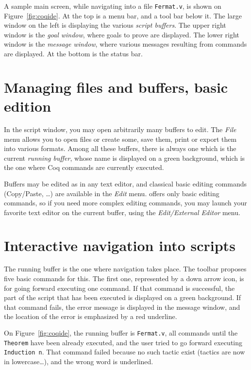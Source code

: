 A sample \CoqIDE{} main screen, while navigating into a file
\verb|Fermat.v|, is shown on Figure~\ref{fig:coqide}.  At
the top is a menu bar, and a tool bar below it. The large window on
the left is displaying the various \emph{script buffers}. The upper right
window is the \emph{goal window}, where goals to 
prove are displayed. The lower right window is the \emph{message window},
where various messages resulting from commands are displayed. At the
bottom is the status bar.

\section{Managing files and buffers, basic edition}

In the script window, you may open arbitrarily many buffers to
edit. The \emph{File} menu allows you to open files or create some,
save them, print or export them into various formats. Among all these
buffers, there is always one which is the current \emph{running
  buffer}, whose name is displayed on a green background, which is the
one where Coq commands are currently executed. 

Buffers may be edited as in any text editor, and classical basic
editing commands (Copy/Paste, \ldots) are available in the \emph{Edit}
menu. \CoqIDE{} offers only basic editing commands, so if you need
more complex editing commands, you may launch your favorite text
editor on the current buffer, using the \emph{Edit/External Editor}
menu. 

\section{Interactive navigation into \Coq{} scripts}

The running buffer is the one where navigation takes place. The
toolbar proposes five basic commands for this. The first one,
represented by a down arrow icon, is for going forward executing one
command. If that command is successful, the part of the script that
has been executed is displayed on a green background. If that command
fails, the error message is displayed in the message window, and the
location of the error is emphasized by a red underline.

On Figure~\ref{fig:coqide}, the running buffer is \verb|Fermat.v|, all
commands until the \verb|Theorem| have been already executed, and the
user tried to go forward executing \verb|Induction n|. That command
failed because no such tactic exist (tactics are now in
lowercase\ldots), and the wrong word is underlined. 

